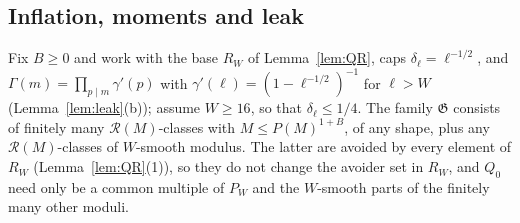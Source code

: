 \documentclass[10pt,reqno]{amsart}
\theoremstyle{definition}
\theoremstyle{remark}
\newcommand{\cR}{\mathscr R}
\newcommand{\cG}{\mathfrak G}
\begin{document}
\subsection{Inflation, moments and leak}
Fix $B\geq0$ and work with the base $R_W$ of Lemma~\ref{lem:QR}, caps
$\delta_\ell=\ell^{-1/2}$, and
$\Gamma(m)=\prod_{p\mid m}\gamma'(p)$ with $\gamma'(\ell)=(1-\ell^{-1/2})^{-1}$
for $\ell>W$ (Lemma~\ref{lem:leak}(b)); assume $W\geq16$, so that
$\delta_\ell\leq1/4$.  The family $\cG$ consists of finitely many
$\cR(M)$-classes with $M\leq P(M)^{1+B}$, of any shape, plus any
$\cR(M)$-classes of $W$-smooth modulus.  The latter are avoided by every
element of $R_W$ (Lemma~\ref{lem:QR}(1)), so they do not change the
avoider set in $R_W$, and $Q_0$ need only be a common multiple of $P_W$ and
the $W$-smooth parts of the finitely many other moduli.
\end{document}
